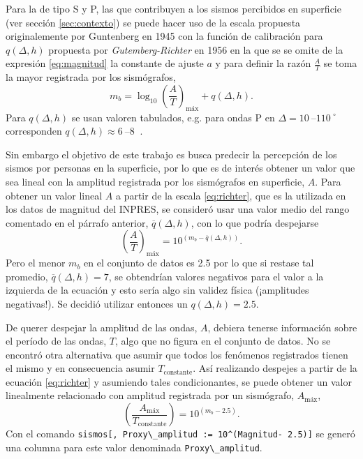 \documentclass[a4paper]{report}
\begin{document}
Para la de tipo S y P, las que contribuyen a los sismos percibidos en superficie (ver sección \ref{sec:contexto}) se puede hacer uso de la escala propuesta originalemente por Guntenberg en 1945 con la función de calibración para \(q(\Delta, h)\) propuesta por \emph{Gutemberg-Richter} en 1956 \cite[ecuación 4.18]{fowler_solid_1990} en la que se se omite de la expresión \ref{eq:magnitud} la constante de ajuste \(a\) y para definir la razón \(\frac{A}{T}\) se toma la mayor registrada por los sismógrafos,
\begin{equation}
	m_b = \log_{10} \left( \frac{A}{T} \right)_\text{máx} + q(\Delta, h).
	\label{eq:richter}
\end{equation}
Para \(q(\Delta, h)\) se usan valoren tabulados, e.g. para ondas P en \(\Delta = \SIrange{10}{110}{} ^\circ\) corresponden \(q(\Delta, h) \approx \SIrange{6}{8}{}\) \cite{willian_l_ellsworth_earthquake_1991}.

Sin embargo el objetivo de este trabajo es busca predecir la percepción de los sismos por personas en la superficie, por lo que es de interés obtener un valor que sea lineal con la amplitud registrada por los sismógrafos en superficie, \(A\).
Para obtener un valor lineal \(A\) a partir de la escala \ref{eq:richter}, que es la utilizada en los datos de magnitud del INPRES, se consideró usar una valor medio del rango comentado en el párrafo anterior, \(\overline{q}(\Delta,h)\), con lo que podría despejarse
\begin{equation}
	\left( \frac{A}{T} \right)_\text{máx} = 10^{(m_b - \overline{q}(\Delta,h) )}.
	\label{eq:linealizacionMagnitud}
\end{equation}
Pero el menor \(m_b\) en el conjunto de datos es \num{2.5} por lo que si restase tal promedio, \(\overline{q}(\Delta,h) = 7\), se obtendrían valores negativos para el valor a la izquierda de la ecuación y esto sería algo sin validez física (¡amplitudes negativas!).
Se decidió utilizar entonces un \(q(\Delta,h) = \num{2.5}\).  

De querer despejar la amplitud de las ondas, \(A\), debiera tenerse información sobre el período de las ondas, \(T\), algo que no figura en el conjunto de datos.
No se encontró otra alternativa que asumir que todos los fenómenos registrados tienen el mismo y en consecuencia asumir \(T_\text{constante}\).
Así realizando despejes a partir de la ecuación \ref{eq:richter} y asumiendo tales condicionantes, se puede obtener un valor linealmente relacionado con amplitud registrada por un sismógrafo, \(A_\text{máx}\),
\begin{equation}
	\left( \frac{A_\text{máx}}{T_\text{constante}} \right) = 10^{(m_b - 2.5)}.
	\label{eq:linealizacionMagnitud_final} 
\end{equation}
Con el comando \verb'sismos[, Proxy\_amplitud := 10^(Magnitud- 2.5)]' se generó una columna para este valor denominada \verb'Proxy\_amplitud'.
\end{document}
